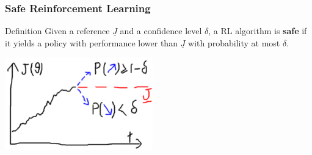 \documentclass{beamer}
\newcommand{\norm}[2][1]{\left\| #2 \right\|_{#1}}
\begin{document}
\begin{frame}
\frametitle{Safe Reinforcement Learning}

\begin{block}{Definition}
Given a reference $\underline{J}$ and a confidence level $\delta$, a RL algorithm is \textbf{safe} if it yields a policy with performance lower than $\underline{J}$ with probability at most $\delta$.

\end{block}

\vfill

\centering
\includegraphics[width=0.48\textwidth]{pictures/safe_explained}



\end{frame}


%
%
%
%
%
\end{document}
